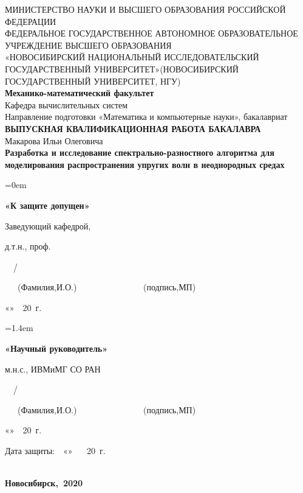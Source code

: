 \begin{singlespacing} %
\thispagestyle{empty} %
\begin{center}
\normalsize{МИНИСТЕРСТВО НАУКИ И ВЫСШЕГО ОБРАЗОВАНИЯ РОССИЙСКОЙ ФЕДЕРАЦИИ}\\
\hfill \break
\normalsize{ФЕДЕРАЛЬНОЕ ГОСУДАРСТВЕННОЕ АВТОНОМНОЕ ОБРАЗОВАТЕЛЬНОЕ УЧРЕЖДЕНИЕ ВЫСШЕГО ОБРАЗОВАНИЯ}\\
\normalsize{«НОВОСИБИРСКИЙ НАЦИОНАЛЬНЫЙ ИССЛЕДОВАТЕЛЬСКИЙ ГОСУДАРСТВЕННЫЙ УНИВЕРСИТЕТ»(НОВОСИБИРСКИЙ ГОСУДАРСТВЕННЫЙ УНИВЕРСИТЕТ, НГУ)}\\
\hfill \break
\large{\textbf{Механико-математический факультет}}\\
\large{Кафедра вычислительных систем}\\
\large{Направление подготовки «Математика и компьютерные науки», бакалавриат}\\
\hfill\break
\normalsize{\textbf{ВЫПУСКНАЯ КВАЛИФИКАЦИОННАЯ РАБОТА БАКАЛАВРА}}\\
\hfill \break
\large{Макарова Ильи Олеговича}\\
\hfill \break
\large{\textbf{Разработка и исследование спектрально-разностного алгоритма для
моделирования распространения упругих волн в неоднородных средах}}\\
\end{center}
\end{singlespacing}

\noindent
\begin{minipage}[t]{80mm}\parindent=0em
\large{\textbf{«К защите допущен»}\par
Заведующий кафедрой,\par
д.т.н., проф.\par
{}\ \ / \ \ \makebox[3cm]{\hrulefill}\par}
\small{\ \ ~(Фамилия,И.О.)~\ \ \ \ \ \ \ \ \ \ \ \ ~ ~(подпись,МП)}\par
\large{«\makebox[1cm]{\hrulefill}»\ \makebox[3cm]{\hrulefill}\ 20\makebox[1cm]{\hrulefill}\ г.}
\end{minipage}
\hfill
\begin{minipage}[t]{80mm}\parindent=1.4em
\large{\textbf{«Научный руководитель»}\par
м.н.с., ИВМиМГ СО РАН\par
{}\ \ / \ \ \makebox[3cm]{\hrulefill}\par}
\small{\ \ ~(Фамилия,И.О.)~\ \ \ \ \ \ \ \ \ \ \ \ ~ ~(подпись,МП)}\par
\large{«\makebox[1cm]{\hrulefill}»\ \makebox[3cm]{\hrulefill}\ 20\makebox[1cm]{\hrulefill}\ г.}
\end{minipage}
\begin{flushright}
\hfill \break
\large{Дата защиты:\ \ \large{«\makebox[1cm]{\hrulefill}» \ \makebox[3cm]{\hrulefill} \ 20\makebox[1cm]{\hrulefill}\ г.}}
\end{flushright}
\begin{singlespacing}
\begin{center}
\large{\textbf{\\Новосибирск,~2020}}
\end{center} 
\end{singlespacing}
\clearpage